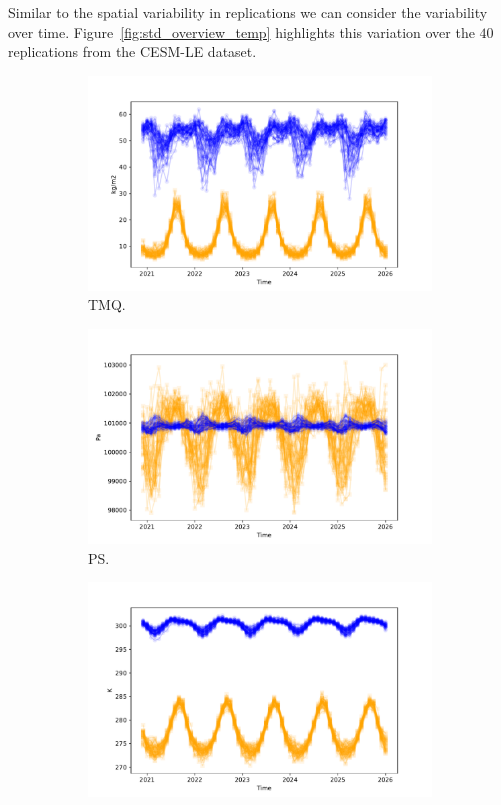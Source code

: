 Similar to the spatial variability in replications we can consider the variability over time.
Figure~\ref{fig:std_overview_temp} highlights this variation over the $40$ replications from the CESM-LE dataset. 

\begin{figure}[htbp!] 
	\centering
	\begin{subfigure}[b]{0.45\textwidth}
		\includegraphics[width=\textwidth]{TMQ_std_temp}
		\caption{TMQ.}
		\label{fig:std_precip_temp}   
	\end{subfigure}             
	\begin{subfigure}[b]{0.45\textwidth}
		\includegraphics[width=\textwidth]{PS_std_temp}
		\caption{PS.}
		\label{fig:std_pressure_temp}
	\end{subfigure}             
	\hfill
	\begin{subfigure}[b]{0.45\textwidth}
		\includegraphics[width=\textwidth]{TREFHT_std_temp}

\end{subfigure}
\end{figure}

